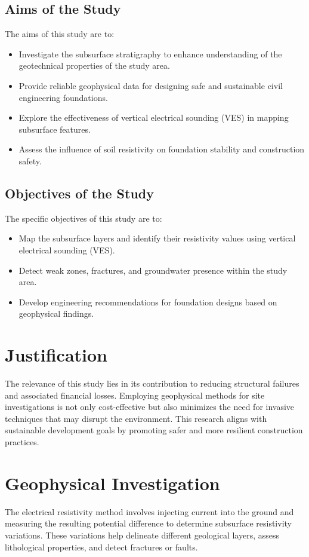 \documentclass[12pt,a4paper]{report}
\begin{document}
\subsection{Aims of the Study}
The aims of this study are to:
\begin{itemize}
    \item Investigate the subsurface stratigraphy to enhance understanding of the geotechnical properties of the study area.
    \item Provide reliable geophysical data for designing safe and sustainable civil engineering foundations.
    \item Explore the effectiveness of vertical electrical sounding (VES) in mapping subsurface features.
    \item Assess the influence of soil resistivity on foundation stability and construction safety.
\end{itemize}

\subsection{Objectives of the Study}
The specific objectives of this study are to:
\begin{itemize}
    \item Map the subsurface layers and identify their resistivity values using vertical electrical sounding (VES).
    \item Detect weak zones, fractures, and groundwater presence within the study area.
    \item Develop engineering recommendations for foundation designs based on geophysical findings.
\end{itemize}

\section{Justification}
The relevance of this study lies in its contribution to reducing structural failures and associated financial losses. Employing geophysical methods for site investigations is not only cost-effective but also minimizes the need for invasive techniques that may disrupt the environment. This research aligns with sustainable development goals by promoting safer and more resilient construction practices.

\section{Geophysical Investigation}
The electrical resistivity method involves injecting current into the ground and measuring the resulting potential difference to determine subsurface resistivity variations. These variations help delineate different geological layers, assess lithological properties, and detect fractures or faults.
\end{document}
